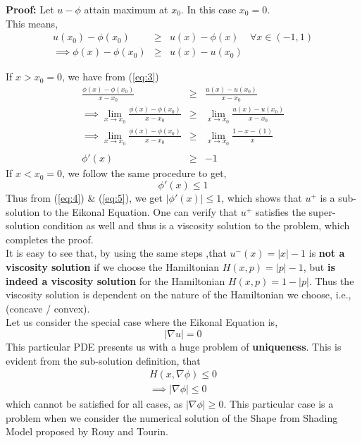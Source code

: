 \documentclass[11pt]{article}
\begin{document}
	\noindent
	\textbf{Proof:} Let $u - \phi$ attain maximum at $x_0$. In this case $x_0 = 0$. \\
	
	\noindent
	This means,
	\begin{eqnarray}
			u(x_0) - \phi(x_0) &\ge& u(x) - \phi(x) \;\;\;\; \forall x \in (-1,1)\\
			\implies \phi(x) - \phi(x_0) &\ge& u(x) - u(x_0) \label{eq:3}
	\end{eqnarray}
	
	\noindent
	If $x>x_0 = 0$, we have from (\ref{eq:3})
	\begin{eqnarray}
		\frac{\phi(x) - \phi(x_0)}{x-x_0} &\ge& \frac{u(x) - u(x_0)}{x-x_0}		\\
		\implies \lim\limits_{x\to x_0} \frac{\phi(x) - \phi(x_0)}{x-x_0} &\ge& \lim\limits_{x\to x_0} \frac{u(x) - u(x_0)}{x-x_0} \\
		\implies \lim\limits_{x\to x_0} \frac{\phi(x) - \phi(x_0)}{x-x_0} &\ge& \lim\limits_{x\to x_0} \frac{1-x - (1)}{x}\\\nonumber\\
		\phi'(x) &\ge& -1 \label{eq:4}		
	\end{eqnarray}
	If $x < x_0 = 0$, we follow the same procedure to get, 
	\begin{equation}
		\phi'(x) \le 1	\label{eq:5}
	\end{equation}
	Thus from (\ref{eq:4}) \& (\ref{eq:5}), we get $|\phi'(x)| \le 1$, which shows that $u^+$ is a sub-solution to the Eikonal Equation. One can verify that $u^+$ satisfies the super-solution condition as well and thus is a viscosity solution to the problem, which completes the proof.\\
	
	\noindent
	It is easy to see that, by using the same steps ,that $u^-(x) = |x| - 1$ is \textbf{not a viscosity solution} if we choose the Hamiltonian $H(x,p) = |p|-1$, but \textbf{is indeed a viscosity solution} for the Hamiltonian $H(x,p) = 1 - |p|$. Thus the viscosity solution is dependent on the nature of the Hamiltonian we choose, i.e., (concave / convex).\\
	
	\noindent
	Let us consider the special case where the Eikonal Equation is,
	\begin{equation}
		|\nabla u | = 0
	\end{equation}
	This particular PDE presents us with a huge problem of \textbf{uniqueness}. This is evident from the sub-solution definition, that 
	\begin{eqnarray}
		H(x,\nabla \phi) \le 0\\
		\implies |\nabla \phi| \le 0
	\end{eqnarray} 
	which cannot be satisfied for all cases, as $|\nabla \phi| \ge 0$. This particular case is a problem when we consider the numerical solution of the Shape from Shading Model proposed by Rouy and Tourin.
\end{document}
